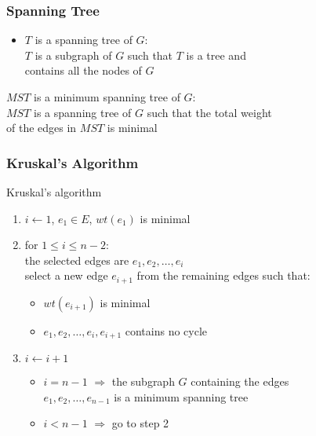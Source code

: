 \documentclass[dvipsnames]{beamer}
\begin{document}
\begin{frame}
  \frametitle{Spanning Tree}

  \begin{itemize}
    \item $T$ is a \alert{spanning tree} of $G$:\\
      $T$ is a subgraph of $G$ such that $T$ is a tree and\\
      contains all the nodes of $G$
  \end{itemize}

  \begin{definition}
    $MST$ is a \alert{minimum spanning tree} of $G$:\\
    $MST$ is a spanning tree of $G$ such that the total weight\\
    of the edges in $MST$ is minimal
  \end{definition}
\end{frame}

\begin{frame}
  \frametitle{Kruskal's Algorithm}

  \begin{block}{Kruskal's algorithm}
    \begin{enumerate}
      \item $i \leftarrow 1$, $e_1 \in E$, $wt(e_1)$ is minimal

      \pause
      \item for $1 \leq i \leq n-2$:\\
        the selected edges are $e_1,e_2,\dots,e_i$\\
        select a new edge $e_{i+1}$ from the remaining edges such that:
      \begin{itemize}
        \item $wt(e_{i+1})$ is minimal
        \item $e_1,e_2,\dots,e_i,e_{i+1}$ contains no cycle
      \end{itemize}

      \pause
      \item $i \leftarrow i+1$
      \begin{itemize}
        \item $i=n-1$ $\Rightarrow$ the subgraph $G$ containing the edges\\
         $e_1,e_2,\dots,e_{n-1}$ is a minimum spanning tree
        \item $i<n-1$ $\Rightarrow$ go to step 2
      \end{itemize}
    \end{enumerate}
  \end{block}
\end{frame}
\end{document}

